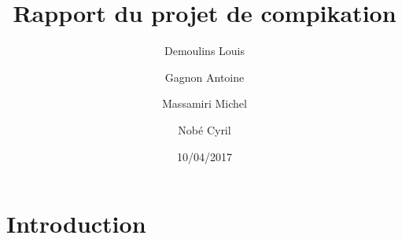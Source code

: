\documentclass{article}
\title{Rapport du projet de compikation}
\date{10/04/2017}
\author{Demoulins Louis \and Gagnon Antoine \and Massamiri Michel \and Nobé Cyril}
\begin{document}
\maketitle


\newpage
\section{Introduction}
\newpage
\end{document}
